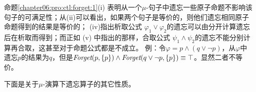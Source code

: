 命题\ref{chapter06:pro:ctl:forget:1}(i) 表明从一个$\mu$-句子中遗忘一些原子命题不影响该句子的可满足性；从(ii)可以看出，如果两个句子是等价的，则他们遗忘相同原子命题得到的结果是等价的； (iv)指出析取公式 $\varphi_1 \vee \varphi_2$的遗忘可以由分开计算遗忘后在析取而得到；而正如 (v) 中指出的那样，合取公式 $\psi_1 \wedge \psi_2$的遗忘不能分别计算再合取，这甚至对于命题公式都是不成立。
例：令$\varphi=p \wedge (q \vee \neg p)$，从$\varphi$中遗忘$p$的结果为$q$，但是$\textit{Forget}(p, \{p\}) \wedge \textit{Forget}(q\vee \neg p, \{p\}) \equiv \top$。显然二者不等价。




下面是关于$\mu$-演算下遗忘算子的其它性质。


